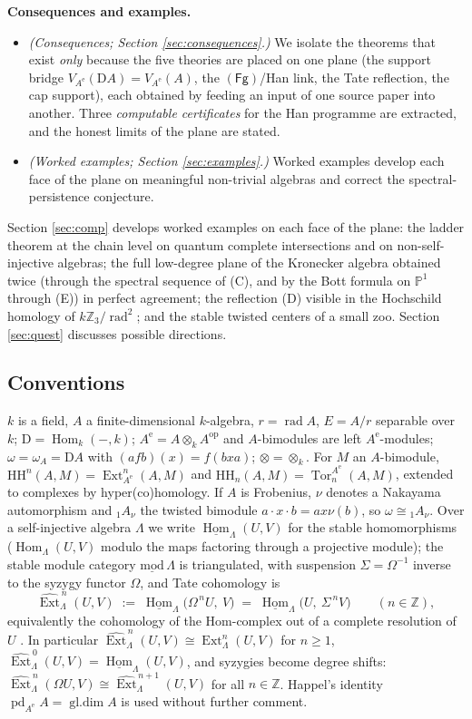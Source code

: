 \documentclass[11pt]{amsart}
\theoremstyle{definition}
\newcommand{\HH}{\mathrm{HH}}
\newcommand{\D}{\mathrm{D}}
\newcommand{\Ext}{\operatorname{Ext}}
\newcommand{\Tor}{\operatorname{Tor}}
\newcommand{\sExt}{\widehat{\operatorname{Ext}}}
\newcommand{\Hom}{\operatorname{Hom}}
\newcommand{\sHom}{\underline{\operatorname{Hom}}}
\newcommand{\gl}{\operatorname{gl.dim}}
\newcommand{\pd}{\operatorname{pd}}
\newcommand{\rad}{\operatorname{rad}}
\newcommand{\Ae}{A^{\mathrm{e}}}
\newcommand{\kk}{k}
\newcommand{\Fg}{\mathsf{(Fg)}}
\newcommand{\Z}{\mathbb{Z}}
\begin{document}
\smallskip
\noindent\textbf{Consequences and examples.}
\begin{itemize}
\item[(I)] \emph{(Consequences; Section \ref{sec:consequences}.)} We isolate the
theorems that exist \emph{only} because the five theories are placed on one
plane (the support bridge $V_{\Ae}(\D A)=V_{\Ae}(A)$, the $\Fg$/Han link,
the Tate reflection, the cap support), each obtained by feeding an input of
one source paper into another. Three \emph{computable certificates} for the
Han programme are extracted, and the honest limits of the plane are
stated.
\item[(J)] \emph{(Worked examples; Section \ref{sec:examples}.)} Worked
examples develop each face of the plane on meaningful non-trivial algebras
and correct the spectral-persistence conjecture.
\end{itemize}

Section \ref{sec:comp} develops worked examples on each face of the plane: the
ladder theorem at the chain level on quantum complete intersections and on
non-self-injective algebras; the full low-degree plane of the Kronecker
algebra obtained twice (through the spectral sequence of (C), and by the Bott
formula on $\mathbb P^1$ through (E)) in perfect agreement; the reflection (D)
visible in the Hochschild homology of $\kk\mathbb Z_3/\rad^2$; and the stable
twisted centers of a small zoo. Section \ref{sec:quest} discusses possible directions.

\subsection*{Conventions}
$\kk$ is a field, $A$ a finite-dimensional $\kk$-algebra, $r=\rad A$,
$E=A/r$ separable over $\kk$; $\D=\Hom_\kk(-,\kk)$;
$\Ae=A\otimes_\kk A^{\mathrm{op}}$ and $A$-bimodules are left
$\Ae$-modules; $\omega=\omega_A=\D A$ with $(afb)(x)=f(bxa)$;
$\otimes=\otimes_\kk$. For $M$ an $A$-bimodule,
$\HH^n(A,M)=\Ext^n_{\Ae}(A,M)$ and $\HH_n(A,M)=\Tor_n^{\Ae}(A,M)$, extended
to complexes by hyper(co)homology. If $A$ is Frobenius, $\nu$ denotes a
Nakayama automorphism and ${}_1A_{\nu}$ the twisted bimodule
$a\cdot x\cdot b=ax\nu(b)$, so $\omega\cong{}_1A_\nu$. Over a
self-injective algebra $\Lambda$ we write $\sHom_\Lambda(U,V)$ for the stable
homomorphisms ($\Hom_\Lambda(U,V)$ modulo the maps factoring through a
projective module); the stable module category
$\underline{\mathrm{mod}}\,\Lambda$ is triangulated, with suspension
$\Sigma=\Omega^{-1}$ inverse to the syzygy functor $\Omega$, and Tate
cohomology is
\[
\sExt^{\,n}_\Lambda(U,V)\;:=\;\sHom_\Lambda\bigl(\Omega^{\,n}U,\ V\bigr)
\;=\;\sHom_\Lambda\bigl(U,\ \Sigma^{\,n}V\bigr)\qquad(n\in\Z),
\]
equivalently the cohomology of the Hom-complex out of a complete resolution
of $U$ \cite{Buchweitz}. In particular
$\sExt^{\,n}_\Lambda(U,V)\cong\Ext^{n}_\Lambda(U,V)$ for $n\ge1$,
$\sExt^{\,0}_\Lambda(U,V)=\sHom_\Lambda(U,V)$, and syzygies become degree
shifts: $\sExt^{\,n}_\Lambda(\Omega U,V)\cong\sExt^{\,n+1}_\Lambda(U,V)$ for
all $n\in\Z$. Happel's identity $\pd_{\Ae}A=\gl A$
\cite{HappelLNM} is used without further comment.
\end{document}
